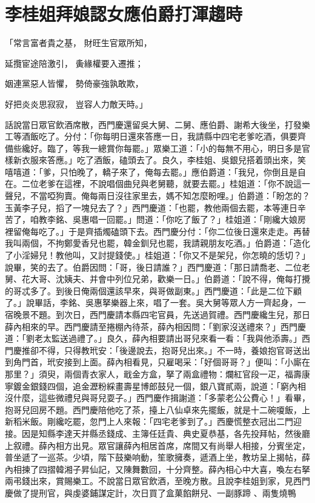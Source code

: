 %

\chapter{李桂姐拜娘認女\KG 應伯爵打渾趨時}

「常言富者貴之基，  財旺生官眾所知，

延攬宦途陪激引，  夤緣權要入遷推；

姻連黨惡人皆懼，  勢倚豪強孰敢欺，

好把炎炎思寂寂，  豈容人力敵天時。」

話說當日眾官飲酒席散，西門慶還留吳大舅、二舅、應伯爵、謝希大後坐，打發樂工等酒飯吃了。分付：「你每明日還來答應一日，我請縣中四宅老爹吃酒，俱要齊備些纔好。臨了，等我一總賞你每罷。」眾樂工道：「小的每無不用心，明日多是官樣新衣服來答應。」吃了酒飯，磕頭去了。良久，李桂姐、吳銀兒搭着頭出來，笑嘻嘻道：「爹，只怕晚了，轎子來了，俺每去罷。」應伯爵道：「我兒，你倒且是自在。二位老爹在這裡，不說唱個曲兒與老舅聽，就要去罷。」桂姐道：「你不說這一聲兒，不當啞狗賣。俺每兩日沒往家里去，媽不知怎麼盼哩。」伯爵道：「盼怎的？玉黃李子兒，搯了一塊兒去了？」西門慶道：「也罷，教他兩個去罷，本等連日辛苦了，咱教李銘、吳惠唱一回罷。」問道：「你吃了飯了？」桂姐道：「剛纔大娘房裡留俺每吃了。」于是齊插燭磕頭下去。西門慶分付：「你二位後日還來走走。再替我叫兩個，不拘鄭愛香兒也罷，韓金釧兒也罷，我請親朋友吃酒。」伯爵道：「造化了小淫婦兒！教他叫，又討提錢使。」桂姐道：「你又不是架兒，你怎曉的恁切？」說畢，笑的去了。伯爵因問：「哥，後日請誰？」西門慶道：「那日請喬老、二位老舅、花大哥、沈姨夫、并會中列位兄弟，歡樂一日。」伯爵道：「說不得，俺每打攪的哥忒多了。到後日俺兩個還該早來，與哥做副東。」西門慶道：「此是二位下顧了。」說畢話，李銘、吳惠拏樂器上來，唱了一套。吳大舅等眾人方一齊起身，一宿晚景不題。到次日，西門慶請本縣四宅官員，先送過賀禮。西門慶纔生兒，那日薛內相來的早。西門慶請至捲棚內待茶，薛內相因問：「劉家沒送禮來？」西門慶道：「劉老太監送過禮了。」良久，薛內相要請出哥兒來看一看：「我與他添壽。」西門慶推卻不得，只得教玳安：「後邊說去，抱哥兒出來。」不一時，養娘抱官哥送出到角門首，玳安接到上面。薛內相看見，只雇喝采：「好個哥哥？」便叫：「小廝在那里？」須臾，兩個青衣家人，戢金方盒，拏了兩盒禮物：爛紅官段一疋，福壽康寧鍍金銀錢四個，追金瀝粉綵畫壽星博郎鼓兒一個，銀八寶貳兩，說道：「窮內相沒什麼，這些微禮兒與哥兒耍子。」西門慶作揖謝道：「多蒙老公公費心！」看畢，抱哥兒回房不題。西門慶陪他吃了茶，擡上八仙卓來先擺飯，就是十二碗嗄飯，上新稻米飯。剛纔吃罷，忽門上人來報：「四宅老爹到了。」西慶慌整衣冠出二門迎接。因是知縣李達天并縣丞錢成、主簿任廷貴、典史夏恭基，各先投拜帖，然後廳上叙禮。薛內相方出見。眾官讓薛內相居首席，席間又有尚舉人相接，分賓坐定，普坐遞了一巡茶。少頃，階下鼓樂响動，笙歌擁奏，遞酒上坐，教坊呈上揭帖，薛內相揀了四摺韓湘子昇仙記，又陳舞數回，十分齊整。薛內相心中大喜，喚左右拏兩弔錢出來，賞賜樂工。不說當日眾官飲酒，至晚方散。且說李桂姐到家，見西門慶做了提刑官，與虔婆鋪謀定計，次日買了盒菓餡餅兒、一副豚蹄 、兩隻燒鴨 